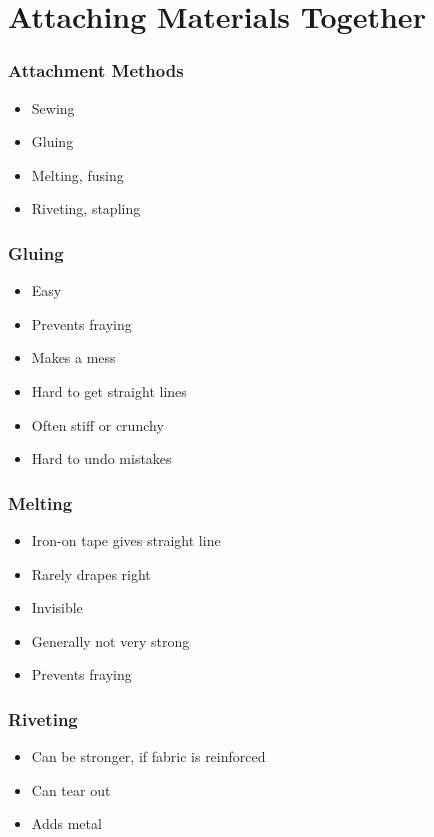 \documentclass{beamer}
\begin{document}
\section{Attaching Materials Together}

\begin{frame}[fragile]
\tableofcontents[currentsection]
\end{frame}


\begin{frame}[fragile]
\frametitle{Attachment Methods}
\begin{itemize}
\item Sewing
\item Gluing
\item Melting, fusing
\item Riveting, stapling
\end{itemize}
\end{frame}

\begin{frame}[fragile]
\frametitle{Gluing}
\begin{itemize}
\item Easy
\item Prevents fraying
\item Makes a mess
\item Hard to get straight lines
\item Often stiff or crunchy
\item Hard to undo mistakes
\end{itemize}
\end{frame}

\begin{frame}[fragile]
\frametitle{Melting}
\begin{itemize}
\item Iron-on tape gives straight line
\item Rarely drapes right
\item Invisible
\item Generally not very strong
\item Prevents fraying
\end{itemize}
\end{frame}

\begin{frame}[fragile]
\frametitle{Riveting}
\begin{itemize}
\item Can be stronger, if fabric is reinforced
\item Can tear out
\item Adds metal
\end{itemize}
\end{frame}
\end{document}
